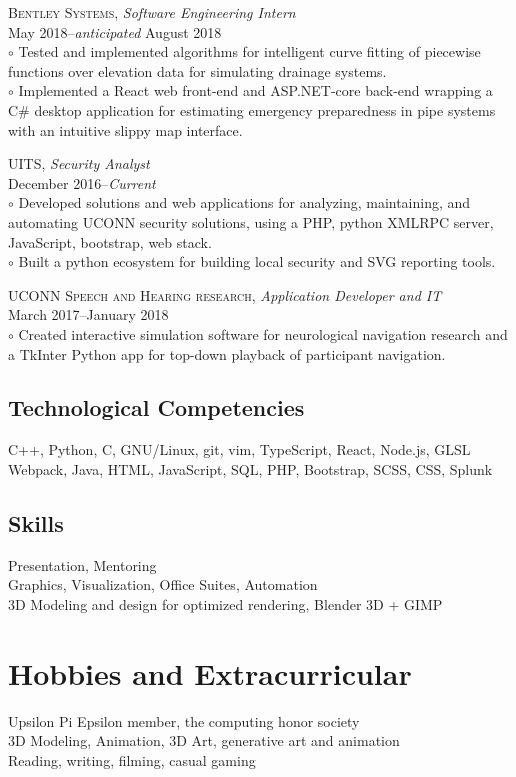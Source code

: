 \documentclass[Letterpaper,11pt]{article}
\begin{document}
    \textsc{Bentley Systems},
    \textit{Software Engineering Intern}\\
    May 2018--\textit{anticipated} August 2018\\
        $\circ$ Tested and implemented algorithms for intelligent curve fitting of piecewise functions over elevation data for simulating drainage systems.
        \\
        $\circ$ Implemented a React web front-end and ASP.NET-core back-end wrapping a C\# desktop application for estimating emergency preparedness in pipe systems with an intuitive slippy map interface.

    \textsc{UITS},
    \textit{Security Analyst}\\
    December 2016--\textit{Current}\\
        $\circ$ Developed solutions and web applications for analyzing, maintaining, and automating UCONN security solutions, using a PHP, python XMLRPC server, JavaScript, bootstrap, web stack.
        \\
        $\circ$ Built a python ecosystem for building local security and SVG reporting tools.

    \textsc{UCONN Speech and Hearing research},
    \textit{Application Developer and IT}\\
    March 2017--January 2018\\
        $\circ$ Created interactive simulation software for neurological navigation research and a TkInter Python app for top-down playback of participant navigation.

\begin{multicols}{2}

    \subsection*{Technological Competencies}

        C++, Python, C, GNU/Linux, git, vim, TypeScript, React, Node.js, GLSL
        \\
        Webpack, Java, HTML, JavaScript, SQL, PHP, Bootstrap, SCSS, CSS, Splunk

    \subsection*{Skills}

        Presentation, Mentoring\\
        Graphics, Visualization, Office Suites, Automation\\
        3D Modeling and design for optimized rendering, Blender 3D + GIMP

\end{multicols}

\section*{Hobbies and Extracurricular}

    Upsilon Pi Epsilon member, the computing honor society\\
    3D Modeling, Animation, 3D Art, generative art and animation\\
    Reading, writing, filming, casual gaming

\clearpage
\end{document}
